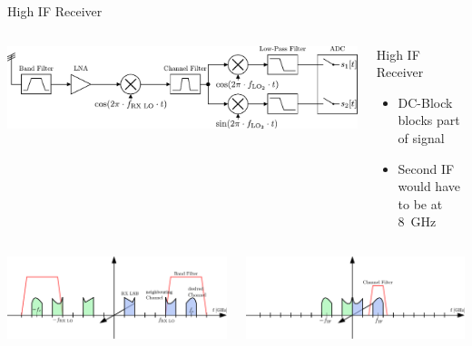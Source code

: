 \documentclass[10pt]{beamer}
\begin{document}
\begin{frame}{High IF Receiver}
  \begin{columns}[T]
    \begin{column}{.6\textwidth}
      \vspace{5mm}
      \includegraphics[width=\textwidth]{figures/rx_0_bd}
    \end{column}
    \begin{column}{.4\textwidth}
      \begin{block}{High IF Receiver}
        \begin{itemize}
        \item DC-Block blocks part of signal
        \item[\frownie] Second IF would have to be at 8~GHz
        \end{itemize}
      \end{block}
    \end{column}
  \end{columns}
  \vspace{1cm}
  \begin{columns}[T]
    \begin{column}{.5\textwidth}
      \includegraphics[width=\textwidth]{figures/rx_rf_0_freq_s}
    \end{column}
    \begin{column}{.5\textwidth}
      \includegraphics[width=\textwidth]{figures/rx_rf_0_freq_i}
    \end{column}
  \end{columns}
  \vspace{11ex}
\end{frame}
\end{document}
